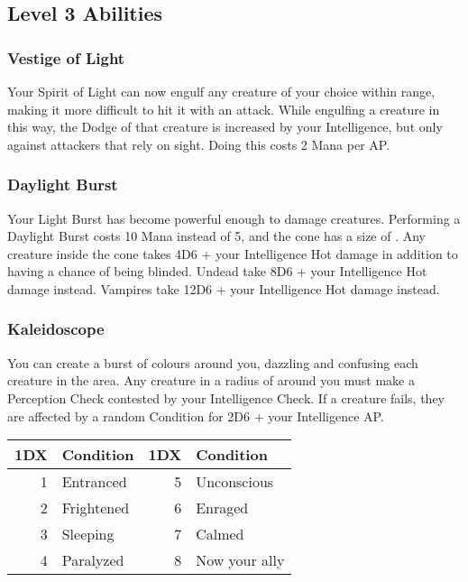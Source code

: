 \subsection{Level 3 Abilities}

\subsubsection{Vestige of Light}
Your Spirit of Light can now engulf any creature of your choice within range, making it more difficult to hit it with an attack. While engulfing a creature in this way, the Dodge of that creature is increased by your Intelligence, but only against attackers that rely on sight. Doing this costs 2 Mana per AP.

\subsubsection{Daylight Burst}
Your Light Burst has become powerful enough to damage creatures. Performing a Daylight Burst costs 10 Mana instead of 5, and the cone has a size of . Any creature inside the cone takes 4D6 + your Intelligence Hot damage in addition to having a chance of being blinded. Undead take 8D6 + your Intelligence Hot damage instead. Vampires take 12D6 + your Intelligence Hot damage instead.

\subsubsection{Kaleidoscope}
You can create a burst of colours around you, dazzling and confusing each creature in the area. Any creature in a radius of  around you must make a Perception Check contested by your Intelligence Check. If a creature fails, they are affected by a random Condition for 2D6 + your Intelligence AP.\\

\begin{tabular}{r | l || r | l}
	1DX & Condition & 1DX & Condition\\
	\hline
	1 & Entranced & 5 & Unconscious \\
	2 & Frightened & 6 & Enraged \\
	3 & Sleeping & 7 & Calmed\\
	4 & Paralyzed & 8 & Now your ally \\
\end{tabular}
\onecolumn